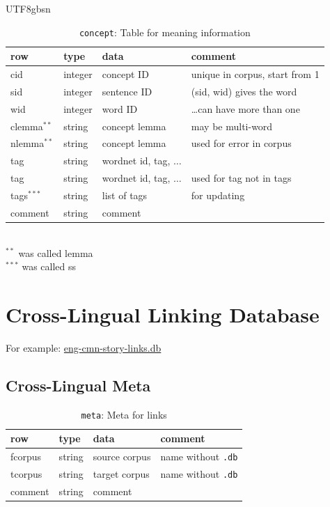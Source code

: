\documentclass[12pt]{book} %
\begin{document}
\begin{CJK}{UTF8}{gbsn}
\begin{table}[htpb]
  \centering  \begin{tabular}{llll}
  \textbf{row}   &  \textbf{type} & \textbf{data} & \textbf{comment} \\\hline
  cid   & integer & concept ID  & unique in corpus, start from 1 \\ 
  sid   & integer & sentence ID & (sid, wid) gives the word \\
  wid   & integer & word ID & \ldots can have more than one\\
  clemma$^{**}$ & string  & concept lemma & may be multi-word \\
  nlemma$^{**}$ & string  & concept lemma & used for error in corpus \\
  tag   & string & wordnet id, tag, $\ldots$ \\
  tag   & string & wordnet id, tag, $\ldots$ & used for tag not in tags\\
  tags$^{***}$  & string & list of tags & for updating \\
  comment & string & comment \\
\hline
\end{tabular}
\\ $^{**}$ was called lemma
\\ $^{***}$ was called ss
\caption{\texttt{concept}: Table for meaning information}
\end{table}

\newpage
\section{Cross-Lingual Linking Database}

For example: \url{eng-cmn-story-links.db}

\subsection{Cross-Lingual Meta}
\begin{table}[htbp]
\centering
  \begin{tabular}{llll}
  \textbf{row}   &  \textbf{type} & \textbf{data} & \textbf{comment} \\
  \hline
  fcorpus & string & source corpus & name without \texttt{.db}\\
  tcorpus & string & target corpus & name without \texttt{.db}\\
  comment & string & comment \\
\hline
\end{tabular}
\caption{\texttt{meta}: Meta for links}
\end{table}


\end{CJK}
\end{document}

